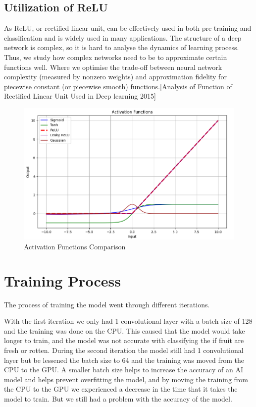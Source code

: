 \documentclass[conference]{IEEEtran}
\begin{document}
\subsection{Utilization of ReLU}
As ReLU, or rectified linear unit, can be effectively used in both pre-training and classification and is widely used in many applications. The structure of a deep network is complex, so it is hard to analyse the dynamics of learning process. Thus, we study how complex networks need to be to approximate certain functions well. Where we optimise the trade-off between neural network complexity (measured by nonzero weights) and approximation fidelity for piecewise constant (or piecewise smooth) functions.[Analysis of Function of Rectified Linear Unit Used in Deep learning 2015]

\begin{figure}[h]
    \centering
    \includegraphics[width=\linewidth]{Activation Functions Compare.PNG}
    \caption{Activation Functions Comparison}
    \label{fig}
\end{figure}

\section{Training Process}

The process of training the model went through different iterations.

With the first iteration we only had 1 convolutional layer with a batch size of 128 and the training was done on the CPU. This caused that the model would take longer to train, and the model was not accurate with classifying the if fruit are fresh or rotten. During the second iteration the model still had 1 convolutional layer but be lessened the batch size to 64 and the training was moved from the CPU to the GPU. A smaller batch size helps to increase the accuracy of an AI model \cite{b2} and helps prevent overfitting the model, and by moving the training from the CPU to the GPU we experienced a decrease in the time that it takes the model to train. But we still had a problem with the accuracy of the model.
\end{document}
